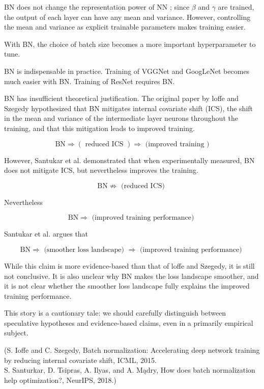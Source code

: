 \documentclass{report}
\begin{document}
\begin{concept}[6.49][Efficiency of BN]
    BN does not change the representation power of NN ; since $\beta$ and $\gamma$ are trained, the output of each layer can have any mean and variance. However, controlling the mean and variance as explicit trainable parameters makes training easier.

    With BN, the choice of batch size becomes a more important hyperparameter to tune.

    BN is indispensable in practice. Training of VGGNet and GoogLeNet becomes much easier with BN. Training of ResNet requires BN.
\end{concept}

\begin{concept}
    BN has insufficient theoretical justification.
    The original paper by loffe and Szegedy hypothesized that BN mitigates internal covariate shift (ICS), the shift in the mean and variance of the intermediate layer neurons throughout the training, and that this mitigation leads to improved training.

    $$
    \mathrm{BN} \Rightarrow(\text { reduced ICS }) \Rightarrow \text { (improved training })
    $$

    However, Santukar et al. demonstrated that when experimentally measured, BN does not mitigate ICS, but nevertheless improves the training.

    $$
    \mathrm{BN} \nRightarrow \text { (reduced ICS) }
    $$

    Nevertheless

    $$
    \mathrm{BN} \Rightarrow \text { (improved training performance) }
    $$

    Santukar et al. argues that

    $$
    \mathrm{BN} \Rightarrow \text { (smoother loss landscape) } \Rightarrow \text { (improved training performance) }
    $$

    While this claim is more evidence-based than that of loffe and Szegedy, it is still not conclusive. It is also unclear why BN makes the loss landscape smoother, and it is not clear whether the smoother loss landscape fully explains the improved training performance.

    This story is a cautionary tale: we should carefully distinguish between speculative hypotheses and evidence-based claims, even in a primarily empirical subject.

    (S. Ioffe and C. Szegedy, Batch normalization: Accelerating deep network training by reducing internal covariate shift, ICML, 2015.\\
    S. Santurkar, D. Tsipras, A. Ilyas, and A. Mądry, How does batch normalization help optimization?, NeurIPS, 2018.)
\end{concept}
\end{document}
